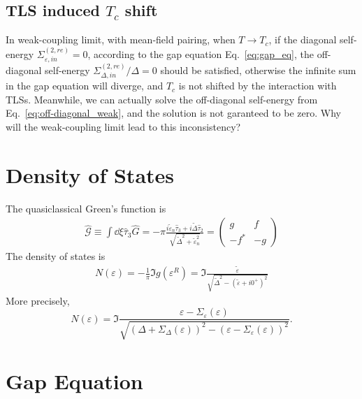 \documentclass[]{article}
\begin{document}
\subsection{TLS induced $T_c$ shift}
In weak-coupling limit, with mean-field pairing, when $T \rightarrow T_c$, if the diagonal self-energy
$\Sigma_{\varepsilon,in}^{(2,re)} = 0$, according to the gap equation Eq.~\eqref{eq:gap_eq},
the off-diagonal self-energy $\Sigma_{\Delta,in}^{(2,re)}/\Delta = 0$ should be satisfied,
otherwise the infinite sum in the gap equation will diverge, and $T_c$ is not shifted by the interaction with TLSs.
Meanwhile, we can actually solve the off-diagonal self-energy from Eq.~\eqref{eq:off-diagonal_weak},
and the solution is not garanteed to be zero. Why will the weak-coupling limit lead to this inconsistency?

\section{Density of States}

The quasiclassical Green's function is
\begin{align}
    \widehat{\mathcal{G}} \equiv \int\dd\xi\widehat{\tau}_3\widehat{G}
    =-\pi\frac{i\tilde{\varepsilon}_n\widehat{\tau}_3 + i\tilde{\Delta}\widehat{\tau}_2}
    {\sqrt{\tilde{\Delta}^2 + \tilde{\varepsilon}_n^2}}
    =\begin{pmatrix}
         g    & f  \\
         -f^* & -g
     \end{pmatrix}
\end{align}
The density of states is
\begin{align}
    N(\varepsilon) = -\frac{1}{\pi}\Im{g(\varepsilon^R)}
    = \Im{\frac{\tilde{\varepsilon}}{\sqrt{\tilde{\Delta}^2 - (\tilde{\varepsilon} + i0^+)^2}}}
\end{align}
More precisely, 
\begin{equation}
  N(\varepsilon) = \Im{\frac{\varepsilon - \Sigma_{\varepsilon}(\varepsilon)}
  {\sqrt{(\Delta+\Sigma_{\Delta}(\varepsilon))^2 - (\varepsilon - \Sigma_{\varepsilon}(\varepsilon))^2}}}.
\end{equation}

\section{Gap Equation}
\end{document}
